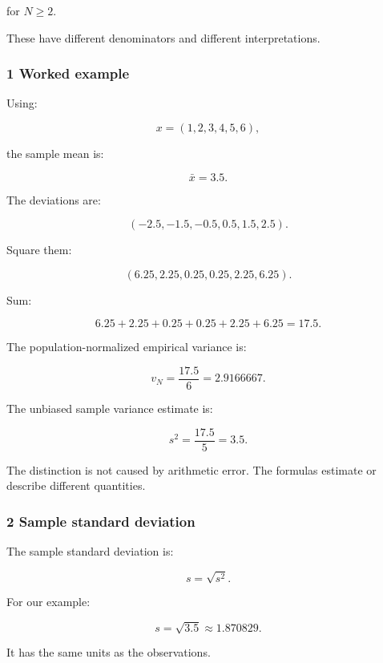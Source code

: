 for \(N\ge2\).

These have different denominators and different interpretations.

\begin{allmightroleexample}

\subsubsection{1 Worked example}\label{02-foundations-ii-ch030-worked-example}

\hypertarget{02-foundations-ii-ch030-worked-example}{}

Using:

\end{allmightroleexample}

\[
 x=(1,2,3,4,5,6),
\]

the sample mean is:

\[
 \bar x=3.5.
\]

The deviations are:

\[
 (-2.5,-1.5,-0.5,0.5,1.5,2.5).
\]

Square them:

\[
 (6.25,2.25,0.25,0.25,2.25,6.25).
\]

Sum:

\[
 6.25+2.25+0.25+0.25+2.25+6.25 =\boxed{17.5}.
\]

The population-normalized empirical variance is:

\[
 v_N=\frac{17.5}{6} =\boxed{2.9166667}.
\]

The unbiased sample variance estimate is:

\[
 s^2=\frac{17.5}{5} =\boxed{3.5}.
\]

The distinction is not caused by arithmetic error. The formulas estimate or describe different quantities.

\subsubsection{2 Sample standard deviation}\label{02-foundations-ii-ch030-sample-standard-deviation}

\hypertarget{02-foundations-ii-ch030-sample-standard-deviation}{}

The sample standard deviation is:

\[
 \boxed{s=\sqrt{s^2}}.
\]

For our example:

\[
 s=\sqrt{3.5}\approx1.870829.
\]

It has the same units as the observations.

